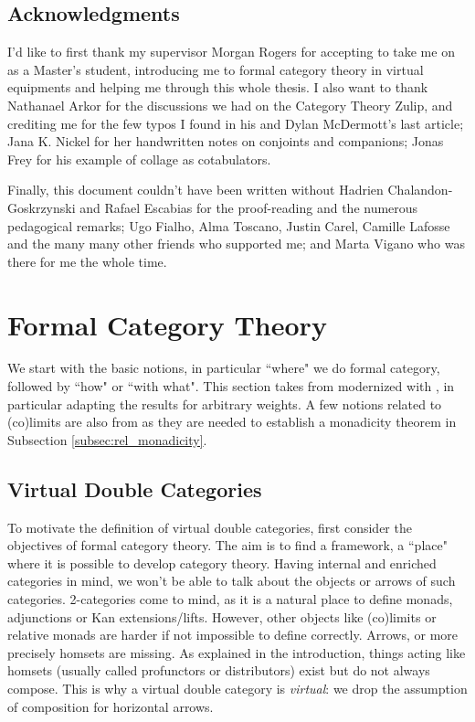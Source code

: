 \documentclass[10pt,a4paper]{article}
\theoremstyle{plain}
\theoremstyle{definition}
\theoremstyle{remark}
\begin{document}
\subsection{Acknowledgments}

I'd like to first thank my supervisor Morgan Rogers for accepting to take me on as a Master's student, introducing me to formal category theory in virtual equipments and helping me through this whole thesis. I also want to thank Nathanael Arkor for the discussions we had on the Category Theory Zulip, and crediting me for the few typos I found in his and Dylan McDermott's last article; Jana K. Nickel for her handwritten notes on conjoints and companions; Jonas Frey for his example of collage as cotabulators.

Finally, this document couldn't have been written without Hadrien Chalandon-Goskrzynski and Rafael Escabias for the proof-reading and the numerous pedagogical remarks; Ugo Fialho, Alma Toscano, Justin Carel, Camille Lafosse and the many many other friends who supported me; and Marta Vigano who was there for me the whole time.

\section{Formal Category Theory}
\label{sec:fct}

We start with the basic notions, in particular ``where" we do formal category, followed by ``how" or ``with what". This section takes from \cite{arkor2024formaltheoryrelativemonads} modernized with \cite{arkor2026presheavescocompletionsformalcategory}, in particular adapting the results for arbitrary weights. A few notions related to (co)limits are also from \cite{arkor2025relativemonadicity} as they are needed to establish a monadicity theorem in Subsection \ref{subsec:rel_monadicity}.

\subsection{Virtual Double Categories}

To motivate the definition of virtual double categories, first consider the objectives of formal category theory. The aim is to find a framework, a ``place" where it is possible to develop category theory. Having internal and enriched categories in mind, we won't be able to talk about the objects or arrows of such categories. 2-categories come to mind, as it is a natural place to define monads, adjunctions or Kan extensions/lifts. However, other objects like (co)limits or relative monads are harder if not impossible to define correctly. Arrows, or more precisely homsets are missing. As explained in the introduction, things acting like homsets (usually called profunctors or distributors) exist but do not always compose. This is why a virtual double category is \textit{virtual}: we drop the assumption of composition for horizontal arrows.
\end{document}
